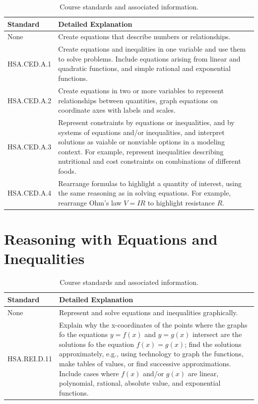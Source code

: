 \documentclass[12pt, oneside]{book}
\begin{document}
\begin{table}[h]
    \centering
    \caption{Course standards and associated information.}
    \vspace{0.3cm} %
    \begin{tabularx}{\textwidth}{l X} %
        \toprule
        \textbf{Standard} & \textbf{Detailed Explanation} \\
        \midrule
        None & Create equations that describe numbers or relationships. \\
        HSA.CED.A.1 & Create equations and ineqalities in one variable and use them to solve problems. Include equations arising from linear and quadratic functions, and simple rational and exponential functions. \\
        HSA.CED.A.2 & Create equations in two or more variables to represent relationships between quantities, graph equations on coordinate axes with labels and scales. \\
        HSA.CED.A.3 & Represent constraints by equations or inequalities, and by systems of equations and/or inequalities, and interpret solutions as vaiable or nonviable options in a modeling context. For example, represent inequalities describing nutritional and cost constraints on combinations of different foods. \\
        HSA.CED.A.4 & Rearrange formulas to highlight a quantity of interest, using the same reasoning as in solving equations. For example, rearrange Ohm's law $V=IR$ to highlight resistance $R$. \\
        \bottomrule
    \end{tabularx}
\end{table}

\chapter{Reasoning with Equations and Inequalities}

\begin{table}[h]
    \centering
    \caption{Course standards and associated information.}
    \vspace{0.3cm} %
    \begin{tabularx}{\textwidth}{l X} %
        \toprule
        \textbf{Standard} & \textbf{Detailed Explanation} \\
        \midrule
        None & Represent and solve equations and inequalities graphically. \\
        HSA.REI.D.11 & Explain why the x-coordinates of the points where the graphs fo the equations $y=f(x)$ and $y=g(x)$ intersect are the solutions fo the equation $f(x)=g(x)$; find the solutions approximately, e.g., using technology to graph the functions, make tables of values, or find successive approximations. Include cases where $f(x)$ and/or $g(x)$ are linear, polynomial, rational, absolute value, and exponential functions.\\
        \bottomrule
    \end{tabularx}
\end{table}
\end{document}
